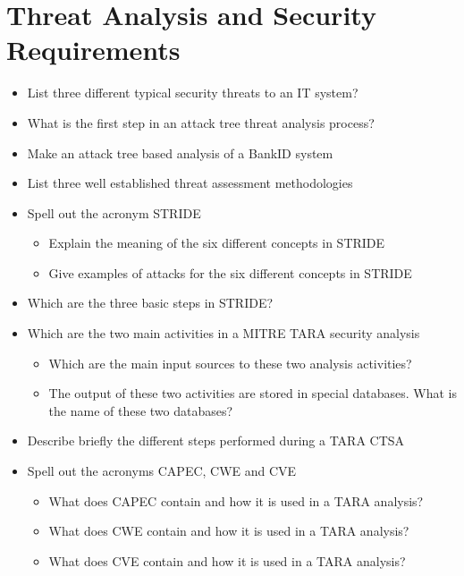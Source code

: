 \section{Threat Analysis and Security Requirements}\label{sec:Threat_Analysis-Security_Requirements}
\begin{itemize}
\item List three different typical security threats to an IT system?
\item What is the first step in an attack tree threat analysis process?
\item Make an attack tree based analysis of a BankID system
\item List three well established threat assessment methodologies
\item Spell out the acronym STRIDE
  \begin{itemize}[noitemsep]
  \item Explain the meaning of the six different concepts in
    STRIDE
  \item Give examples of attacks for the six different concepts in STRIDE
  \end{itemize}

\item Which are the three basic steps in STRIDE?
\item Which are the two main activities in a MITRE TARA security analysis
  \begin{itemize}[noitemsep]
  \item Which are the main input sources to these two analysis
    activities?
  \item The output of these two activities are stored in special databases. What is the name of these two databases?
  \end{itemize}

\item Describe briefly the different steps performed during a TARA CTSA
\item Spell out the acronyms CAPEC, CWE and CVE
  \begin{itemize}[noitemsep]
  \item What does CAPEC contain and how it is used in a TARA
    analysis?
  \item What does CWE contain and how it is used in a TARA analysis?
  \item What does CVE contain and how it is used in a TARA analysis?
  \end{itemize}


\end{itemize}
